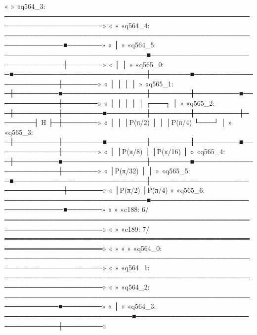 «                                                                              »
«q564_3: ──────────────────────────────────────────────────────────────────────»
«                                                                              »
«q564_4: ──────────────────────────────────────────────────────────────■───────»
«                                                                      │       »
«q564_5: ─────────────────────────────■────────────────────────────────┼───────»
«                                     │                                │       »
«q565_0: ─■───────────────────────────┼────────■───────────────────────┼───────»
«         │                           │        │                       │       »
«q565_1: ─┼─────────■─────────────────┼────────┼─────────■─────────────┼───────»
«         │         │                 │        │         │       ┌───┐ │       »
«q565_2: ─┼─────────┼────────■────────┼────────┼─────────┼───────┤ H ├─┼───────»
«         │         │        │P(π/2)  │        │         │P(π/4) └───┘ │       »
«q565_3: ─┼─────────┼────────■────────┼────────┼─────────■─────────────┼───────»
«         │         │P(π/8)           │        │P(π/16)                │       »
«q565_4: ─┼─────────■─────────────────┼────────■───────────────────────┼───────»
«         │P(π/32)                    │                                │       »
«q565_5: ─■───────────────────────────┼────────────────────────────────┼───────»
«                                     │P(π/2)                          │P(π/4) »
«q565_6: ─────────────────────────────■────────────────────────────────■───────»
«                                                                              »
«c188: 6/══════════════════════════════════════════════════════════════════════»
«                                                                              »
«c189: 7/══════════════════════════════════════════════════════════════════════»
«                                                                              »
«                                                                              »
«q564_0: ──────────────────────────────────────────────────────────────────────»
«                                                                              »
«q564_1: ──────────────────────────────────────────────────────────────────────»
«                                                                              »
«q564_2: ─────────────────────────────────────────────────────────────■────────»
«                                                                     │        »
«q564_3: ──────────────────────────■──────────────────────────────────┼────────»
